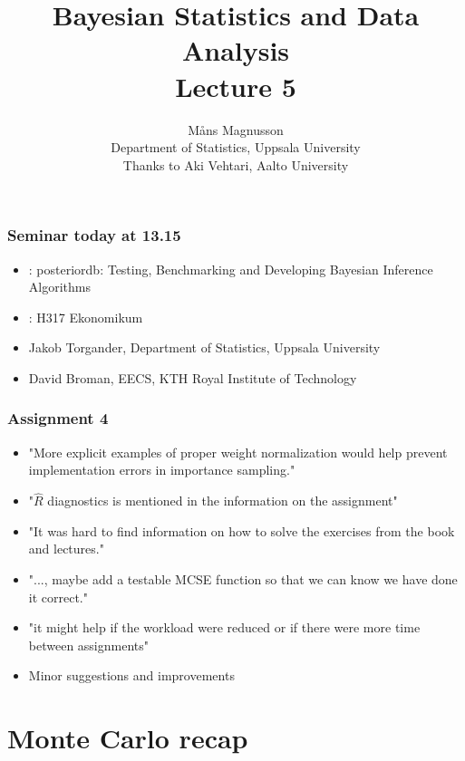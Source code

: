 \documentclass[10pt]{beamer}
\title[]{{\color{black}Bayesian Statistics and Data Analysis \\ Lecture 5}}
\author[]{M{\aa}ns Magnusson \\ Department of Statistics, Uppsala University \\ Thanks to Aki Vehtari, Aalto University}
\date{}
\begin{document}
\frame{\titlepage
}



\begin{frame}
  \frametitle{Seminar today at 13.15}

  \begin{itemize}
  \item {}: posteriordb: Testing, Benchmarking and Developing Bayesian Inference Algorithms
  \item {}: H317 Ekonomikum
  \item {} Jakob Torgander, Department of Statistics, Uppsala University
  \item {} David Broman, EECS, KTH Royal Institute of Technology
  \end{itemize}

\end{frame}

\begin{frame}
  \frametitle{Assignment 4}

  \begin{itemize}
  \item "More explicit examples of proper weight normalization would help prevent implementation errors in importance sampling."\pause
  \item "$\hat{R}$ diagnostics is mentioned in the information on the assignment" \pause
  \item "It was hard to find information on how to solve the exercises from the book and lectures." \pause
  \item "..., maybe add a testable MCSE function so that we can know we have done it correct." \pause
  \item "it might help if the workload were reduced or if there were more time between assignments" \pause
  \item Minor suggestions and improvements
  \end{itemize}

\end{frame}

\section{Monte Carlo recap}
\end{document}
